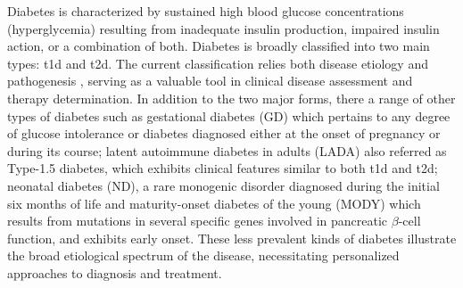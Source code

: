Diabetes is characterized by sustained high blood glucose concentrations (hyperglycemia) %
resulting from inadequate insulin production, impaired insulin action, or a combination of both. Diabetes is broadly classified into two main types: \gls{t1d} and \gls{t2d}. The current classification relies both disease etiology and pathogenesis \textbf{\cite{banday_pathophysiology_2020}}, serving as a valuable tool in clinical disease assessment and therapy determination. In addition to the two major forms, there a range of other types of diabetes such as gestational diabetes (GD) which pertains to any degree of glucose intolerance or diabetes diagnosed either at the onset of pregnancy or during its course; latent autoimmune diabetes in adults (LADA) also referred as Type-1.5 diabetes, which exhibits clinical features similar to both \gls{t1d} and \gls{t2d}; neonatal diabetes (ND), a rare monogenic disorder diagnosed during the initial six months of life and maturity-onset diabetes of the young (MODY) which results from mutations in several specific genes involved in pancreatic $\beta$-cell function, and exhibits early onset. These less prevalent kinds of diabetes illustrate the broad etiological spectrum of the disease, necessitating personalized approaches to diagnosis and treatment.





